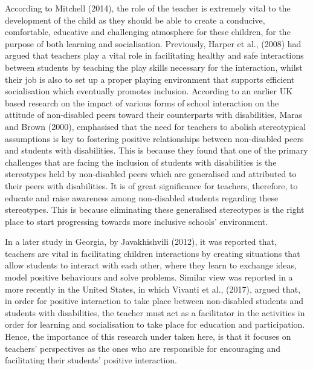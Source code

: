 \documentclass[11pt]{sig-alternate}
\begin{document}
\begin{large}
According to Mitchell (2014), the role of the teacher is extremely vital to the development of the child as they should be able to create a conducive, comfortable, educative and challenging atmosphere for these children, for the purpose of both learning and socialisation. Previously, Harper et al., (2008) had argued that teachers play a vital role in facilitating healthy and safe interactions between students by teaching the play skills necessary for the interaction, whilst their job is also to set up a proper playing environment that supports efficient socialisation which eventually promotes inclusion. According to an earlier UK based research on the impact of various forms of school interaction on the attitude of non-disabled peers toward their counterparts with disabilities, Maras and Brown (2000), emphasised that the need for teachers to abolish stereotypical assumptions is key to fostering positive relationships between non-disabled peers and students with disabilities. This is because they found that one of the primary challenges that are facing the inclusion of students with disabilities is the stereotypes held by non-disabled peers which are generalised and attributed to their peers with disabilities. It is of great significance for teachers, therefore, to educate and raise awareness among non-disabled students regarding these stereotypes. This is because eliminating these generalised stereotypes is the right place to start progressing towards more inclusive schools’ environment. 

In a later study in Georgia, by Javakhishvili (2012), it was reported that, teachers are vital in facilitating children interactions by creating situations that allow students to interact with each other, where they learn to exchange ideas, model positive behaviours and solve problems. Similar view was reported in a more recently in the United States, in which Vivanti et al., (2017), argued that, in order for positive interaction to take place between non-disabled students and students with disabilities, the teacher must act as a facilitator in the activities in order for learning and socialisation to take place for education and participation. Hence, the importance of this research under taken here, is that it focuses on teachers’ perspectives as the ones who are responsible for encouraging and facilitating their students' positive interaction. 


\end{large}
\end{document}

